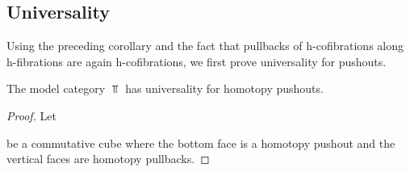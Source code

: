 \subsection*{Universality}
Using the preceding corollary and the fact that pullbacks of h-cofibrations along h-fibrations are again h-cofibrations, we first prove universality for pushouts.
\begin{prop}\label{lem:topUniversalPo}
    The model category $\Top$ has universality for homotopy pushouts.
    \begin{proof}
        Let 
        \begin{center}
        \end{center}
        be a commutative cube where the bottom face is a homotopy pushout and the vertical faces are homotopy pullbacks.
        

\end{proof}
\end{prop}
